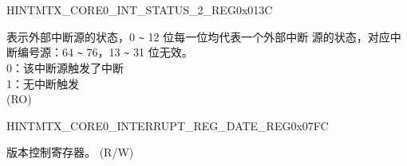 \begin{register}{H}{INTMTX\_CORE0\_INT\_STATUS\_2\_REG}{0x013C}\label{regdesc:INTMTXCORE0INTSTATUS2REG}
%
\regnewline%
\begin{regdesc}\begin{reglist}
\label{fielddesc:INTMTXCORE0INTSTATUS2}\item [INTMTX\_CORE0\_INT\_STATUS\_2] 表示外部中断源的状态，0 \verb+~+ 12 位每一位均代表一个外部中断
源的状态，对应中断编号源：64 \verb+~+ 76，13 \verb+~+ 31 位无效。\\
0：该中断源触发了中断\\
1：无中断触发\\
(RO)
\end{reglist}\end{regdesc}
\end{register}




\begin{register}{H}{INTMTX\_CORE0\_INTERRUPT\_REG\_DATE\_REG}{0x07FC}\label{regdesc:INTMTXCORE0INTERRUPTREGDATEREG}
%
%
\regnewline%
\begin{regdesc}\begin{reglist}
\label{fielddesc:INTMTXCORE0INTERRUPTREGDATE}\item [INTMTX\_CORE0\_INTERRUPT\_REG\_DATE] 版本控制寄存器。 (R/W)
\end{reglist}\end{regdesc}
\end{register}
